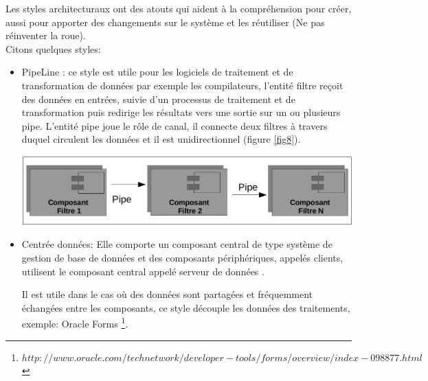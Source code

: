 \documentclass[12pt, a4paper, openany]{report}
\begin{document}
 Les styles architecturaux ont des atouts qui aident à la compréhension pour créer, aussi pour apporter des changements sur le système et les réutiliser (Ne pas réinventer la roue).\\
 
  Citons quelques styles:
  \begin{itemize}
      \item  PipeLine \cite{refbibPipeLine}: ce style est utile pour les logiciels de traitement et de transformation de données par exemple les compilateurs, l'entité filtre reçoit des données en entrées, suivie d'un processus de traitement et de transformation puis redirige les résultats vers une sortie sur un ou plusieurs pipe. L'entité pipe joue le rôle de canal, il connecte deux filtres à travers duquel circulent les données et il est unidirectionnel (figure \ref{fig8}).
 
              \begin{center}
                \includegraphics[scale=0.3]{pipe_line_8.png}
                \label{fig8}
              \end{center}
              
      \item  Centrée données: Elle comporte un composant central de type système de gestion de base de données et des composants périphériques, appelés clients, utilisent le composant central appelé serveur de données \cite{refbibCentreDonnee}.
      
      Il est utile dans le cas où des données sont partagées et fréquemment échangées entre les composants, ce style découple les données des traitements, exemple: Oracle Forms \footnote{$http://www.oracle.com/technetwork/developer-tools/forms/overview/index-098877.html$}.
      

\end{itemize}
\end{document}
